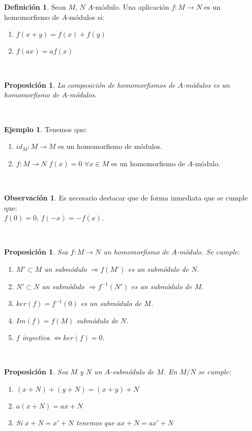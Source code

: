 \documentclass{article}
\theoremstyle{theorem-style}  %
\newtheorem{proposition}[theorem]{Proposición}
\theoremstyle{definition}
\newtheorem{definition}{Definición}[section]
\newtheorem*{observation}{Observación} %
\theoremstyle{example-style}
\newtheorem{example}{Ejemplo}[section]
\begin{document}
	\begin{definition}
		Sean $M$, $N$ $A$-módulo. Una aplicación $f:M \rightarrow N$ es un homomorfismo de $A$-módulos si:
		\begin{enumerate}
		\item  $f(x+y) = f(x)+f(y)$
		\item $f(ax) = af(x)$
		\end{enumerate}
	\end{definition}
	\ 

	\begin{proposition}
		La composición de homomorfismos de $A$-módulos es un homomorfismo de $A$-módulos.
	\end{proposition}
	\ 

	\begin{example} Tenemos que:
		\begin{enumerate}
			\item $id_M : M \rightarrow M$ es un homomorfismo de módulos.
			\item $f: M \rightarrow N$ $f(x) = 0$ $\forall x \in M$ es un homomorfismo de $A$-módulo.
		\end{enumerate}
	\end{example}
	\ 

	\begin{observation}
		Es necesario destacar que de forma inmediata que se cumple que:\\ $f(0) = 0$, $f(-x) = -f(x)$.
	\end{observation}
	\ 

	\begin{proposition}
		Sea $f: M \rightarrow N$ un homomorfismo de $A$-módulo. Se cumple:
		\begin{enumerate}
			\item $M'  \subset M$ un submódulo $\Rightarrow f(M')$ es un submódulo de $N$.
			\item $N' \subset N$ un submódulo $\Rightarrow f^{-1}(N')$ es un submódulo de $M$.
			\item $ker(f) = f^{-1}(0)$ es un submódulo de $M$.
			\item $Im(f) = f(M)$ submódulo de $N$.
			\item $f$ inyectiva  $\Leftrightarrow ker(f) = 0$.
		\end{enumerate}
	\end{proposition}
	\ 

	\begin{proposition}
		Sea $M$ y $N$ un $A$-submódulo de $M$. En $M/N$ se cumple:
		\begin{enumerate}
			\item$(x + N) + (y + N) =(x +y) + N$
			\item $a(x + N) = ax + N $
			\item Si $x + N = x\prime +N$ tenemos que  $ax +N=ax\prime +N$
		\end{enumerate}
	\end{proposition}
\end{document}
